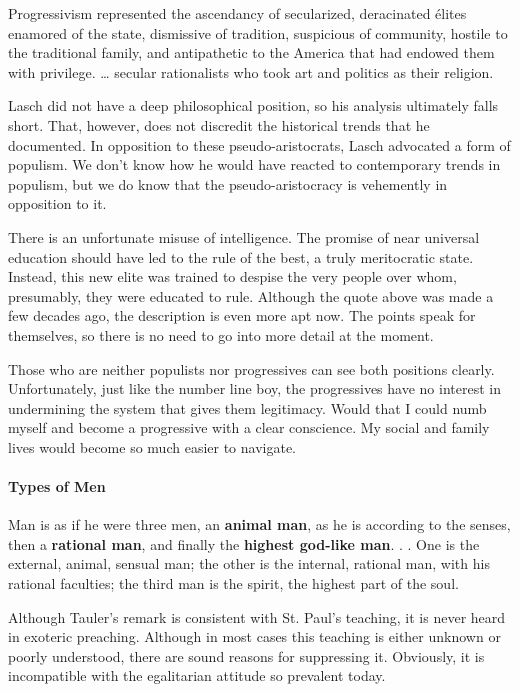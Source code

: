 \begin{quotex}
Progressivism represented the ascendancy of secularized, deracinated élites enamored of the state, dismissive of tradition, suspicious of community, hostile to the traditional family, and antipathetic to the America that had endowed them with privilege. … secular rationalists who took art and politics as their religion. 

\end{quotex}
Lasch did not have a deep philosophical position, so his analysis ultimately falls short. That, however, does not discredit the historical trends that he documented. In opposition to these pseudo-aristocrats, Lasch advocated a form of populism. We don't know how he would have reacted to contemporary trends in populism, but we do know that the pseudo-aristocracy is vehemently in opposition to it.

There is an unfortunate misuse of intelligence. The promise of near universal education should have led to the rule of the best, a truly meritocratic state. Instead, this new elite was trained to despise the very people over whom, presumably, they were educated to rule. Although the quote above was made a few decades ago, the description is even more apt now. The points speak for themselves, so there is no need to go into more detail at the moment.

Those who are neither populists nor progressives can see both positions clearly. Unfortunately, just like the number line boy, the progressives have no interest in undermining the system that gives them legitimacy. Would that I could numb myself and become a progressive with a clear conscience. My social and family lives would become so much easier to navigate.

\paragraph{Types of Men}
\begin{quotex}
Man is as if he were three men, an \textbf{animal man}, as he is according to the senses, then a \textbf{rational man}, and finally the \textbf{highest god-like man}. . . One is the external, animal, sensual man; the other is the internal, rational man, with his rational faculties; the third man is the spirit, the highest part of the soul. 

\end{quotex}
Although Tauler's remark is consistent with St. Paul's teaching, it is never heard in exoteric preaching. Although in most cases this teaching is either unknown or poorly understood, there are sound reasons for suppressing it. Obviously, it is incompatible with the egalitarian attitude so prevalent today.

